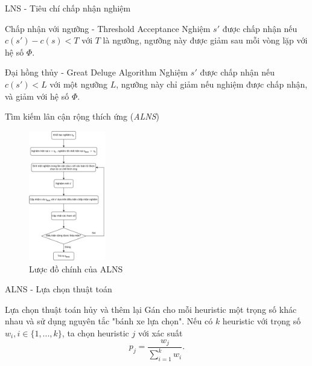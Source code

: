 \begin{frame}{LNS - Tiêu chí chấp nhận nghiệm}
  \begin{block}{Chấp nhận với ngưỡng - Threshold Acceptance}
    Nghiệm $s'$ được chấp nhận nếu $c(s') - c(s) < T$ với $T$ là ngưỡng, ngưỡng này được giảm sau mỗi vòng lặp với hệ số $\Phi$.
  \end{block}
  
  \begin{block}{Đại hồng thủy - Great Deluge Algorithm}
    Nghiệm $s'$ được chấp nhận nếu $c(s') < L$ với một ngưỡng $L$, ngưỡng này chỉ giảm nếu nghiệm được chấp nhận, và giảm với hệ số $\Phi$.
  \end{block}
\end{frame}

\begin{frame}{Tìm kiếm lân cận rộng thích ứng (\textit{ALNS})}
  \begin{figure}[H] %
    \centering %
    \includegraphics[width=0.3\textwidth]{figures/ALNS-flowchart.png} 
    \caption{Lược đồ chính của ALNS} 
  \end{figure}
\end{frame}

\begin{frame}{ALNS - Lựa chọn thuật toán}
  \begin{block}{Lựa chọn thuật toán hủy và thêm lại}
    Gán cho mỗi heuristic một trọng số khác nhau và sử dụng nguyên tắc "bánh xe lựa chọn". Nếu có $k$ heuristic với trọng số $w_i, i \in \{1,...,k\}$, ta chọn heuristic $j$ với xác suất
    \begin{equation}
      \label{eq:select}
      p_j = \frac{w_j}{\sum_{i=1}^k w_i}.
    \end{equation}
  \end{block}
\end{frame}

